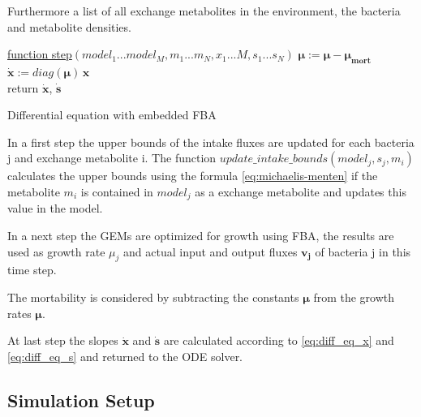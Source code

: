 \documentclass[a4paper,10pt]{article}
\begin{document}
Furthermore a list of all exchange metabolites in the environment, the bacteria and metabolite densities.


\begin{algorithm}

    \underline{function step}$(model_1...model_M, m_1...m_N, x_1...M, s_1...s_N)$\;
    $\bm{\mu} := \bm{\mu} - \bm{\mu_{mort}}$\\
    $\dot{\bm{x}} := diag(\bm{\mu}) \, \bm{x}$\\
    return $\dot{\bm{x}}$, $\dot{\bm{s}}$
    \caption{Differential equation with embedded FBA}
    \label{alg:differential_equation_with_embedded_fba}
\end{algorithm}

In a first step the upper bounds of the intake fluxes are updated for each bacteria j and exchange metabolite i.
The function $update\_intake\_bounds(model_j, s_j, m_i)$ calculates the upper bounds using the formula \ref{eq:michaelis-menten} if
the metabolite $m_i$ is contained in $model_j$ as a exchange metabolite and updates this value in the model.

In a next step the GEMs are optimized for growth using FBA, the results are used as growth rate $\mu_j$ and actual input and output
fluxes $\bm{v_j}$ of bacteria j in this time step.

The mortability is considered by subtracting the constants $\bm{\mu}$ from the growth rates $\bm{\mu}$.

At last step the slopes $\dot{\bm{x}}$ and $\bm{\dot{s}}$ are calculated according to \ref{eq:diff_eq_x} and \ref{eq:diff_eq_s} and
returned to the ODE solver.

\subsection{Simulation Setup}
\end{document}
